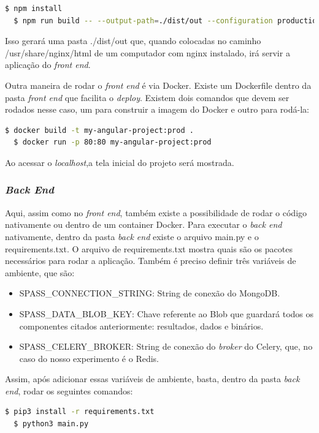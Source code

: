 \documentclass[11pt,twoside]{article}
\begin{document}
\begin{lstlisting}[language=bash]
  $ npm install 
  $ npm run build -- --output-path=./dist/out --configuration production
\end{lstlisting}

Isso gerará uma pasta ./dist/out que, quando colocadas no caminho /usr/share/nginx/html de um computador com nginx instalado, irá servir a aplicação do \emph{front end}.

Outra maneira de rodar o \emph{front end} é via Docker. Existe um Dockerfile dentro da pasta \emph{front end} que facilita o \emph{deploy}. Existem dois comandos que devem ser rodados nesse caso, um
para construir a imagem do Docker e outro para rodá-la:

\begin{lstlisting}[language=bash]
  $ docker build -t my-angular-project:prod .
  $ docker run -p 80:80 my-angular-project:prod
\end{lstlisting}

Ao acessar o \emph{localhost},a tela inicial do projeto será mostrada.

\subsubsection{\emph{Back End}}

Aqui, assim como no \emph{front end}, também existe a possibilidade de rodar o código nativamente ou dentro de um container Docker. Para executar o \emph{back end} nativamente, dentro da pasta \emph{back end}
existe o arquivo main.py e o requirements.txt. O arquivo de requirements.txt mostra quais são os pacotes necessários para rodar a aplicação. Também é preciso definir três
variáveis de ambiente, que são:

\begin{itemize}
  \item SPASS\_CONNECTION\_STRING: String de conexão do MongoDB.
  \item SPASS\_DATA\_BLOB\_KEY: Chave referente ao Blob que guardará todos os componentes citados anteriormente: resultados, dados e binários.
  \item SPASS\_CELERY\_BROKER: String de conexão do \emph{broker} do Celery, que, no caso do nosso experimento é o Redis.
\end{itemize}

Assim, após adicionar essas variáveis de ambiente, basta, dentro da pasta \emph{back end}, rodar os seguintes comandos:

\begin{lstlisting}[language=bash]
  $ pip3 install -r requirements.txt
  $ python3 main.py
\end{lstlisting}
\end{document}
